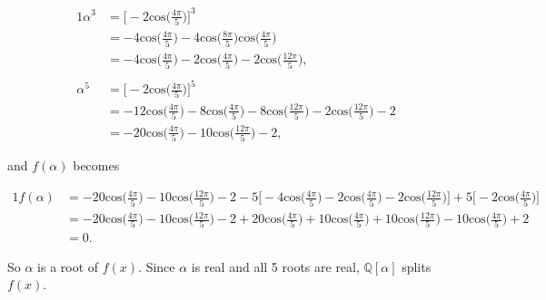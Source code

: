 \documentclass{article}
\begin{document}
\begin{alignat*}{1}
  \alpha^3 &= \bigg[ -2 \mathrm{cos} \bigg( \frac{4 \pi}{5} \bigg) \bigg]^3 \\ 
  &= -4 \mathrm{cos} \bigg( \frac{4 \pi}{5} \bigg) - 4\mathrm{cos} \bigg( \frac{8 \pi}{5} \bigg) \mathrm{cos} \bigg( \frac{4 \pi}{5} \bigg) \\ 
  &= -4 \mathrm{cos} \bigg( \frac{4 \pi}{5} \bigg) - 2 \mathrm{cos} \bigg( \frac{4 \pi}{5} \bigg) - 2 \mathrm{cos} \bigg( \frac{12 \pi}{5} \bigg), \\ 
  \\ 
  \alpha ^5 &= \bigg[ -2 \mathrm{cos} \bigg( \frac{4 \pi}{5} \bigg) \bigg]^5 \\ 
  &= -12 \mathrm{cos} \bigg( \frac{4 \pi}{5} \bigg) -8\mathrm{cos} \bigg( \frac{4 \pi}{5} \bigg) -8\mathrm{cos} \bigg( \frac{12 \pi}{5} \bigg)
  - 2 \mathrm{cos} \bigg( \frac{12 \pi}{5} \bigg) - 2 \\ 
  &= -20 \mathrm{cos} \bigg( \frac{4 \pi}{5} \bigg) - 10 \mathrm{cos} \bigg( \frac{12 \pi}{5} \bigg) - 2,
\end{alignat*}

and $f(\alpha)$ becomes 

\begin{alignat*}{1}
  f(\alpha) &= -20 \mathrm{cos} \bigg( \frac{4 \pi}{5} \bigg) - 10 \mathrm{cos} \bigg( \frac{12 \pi}{5} \bigg) - 2 
  -5 \bigg[ -4 \mathrm{cos} \bigg( \frac{4 \pi}{5} \bigg) - 2 \mathrm{cos} \bigg( \frac{4 \pi}{5} \bigg) - 2 \mathrm{cos} \bigg( \frac{12 \pi}{5} \bigg) \bigg] 
  + 5\bigg[ -2 \mathrm{cos} \bigg( \frac{4 \pi}{5} \bigg) \bigg] \\ 
  &= -20 \mathrm{cos}\bigg( \frac{4 \pi}{5} \bigg) -10 \mathrm{cos}\bigg( \frac{12 \pi}{5} \bigg) 
  - 2 + 20 \mathrm{cos}\bigg( \frac{4 \pi}{5} \bigg) + 10 \mathrm{cos}\bigg( \frac{4 \pi}{5} \bigg) 
  + 10 \mathrm{cos}\bigg( \frac{12 \pi}{5} \bigg) - 10 \mathrm{cos}\bigg( \frac{4 \pi}{5} \bigg) + 2 \\ 
  &= 0.  
\end{alignat*}

So $\alpha$ is a root of $f(x)$.  Since $\alpha$ is real and 
all 5 roots are real, $\mathbb{Q}[\alpha]$ 
splits $f(x)$.
\end{document}
